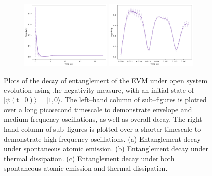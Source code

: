 \documentclass[11pt]{article}
\begin{document}
\begin{figure}[H]
    \vspace{0.8em}

    \begin{subfigure}{\textwidth}
        \centering
        \includegraphics[width=0.49\textwidth]{Research Project/Code/results/ExVib/Open/Negativity/Envelope/neg_both_e0.png}
        \hfill
        \includegraphics[width=0.49\textwidth]{Research Project/Code/results/ExVib/Open/Negativity/Fast/neg_both_e0.png}
        \caption{}
        \label{fig:EVM_OQS_Neg_both_e0}
    \end{subfigure}
    \caption{Plots of the decay of entanglement of the EVM under open system evolution using the negativity measure, with an initial state of $|\psi (\text{t=0})\rangle = |1, 0\rangle$. The left--hand column of sub--figures is plotted over a long picosecond timescale to demonstrate envelope and medium frequency oscillations, as well as overall decay. The right--hand column of sub--figures is plotted over a shorter timescale to demonstrate high frequency oscillations. (a) Entanglement decay under spontaneous atomic emission. (b) Entanglement decay under thermal dissipation. (c) Entanglement decay under both spontaneous atomic emission and thermal dissipation.}
    \label{fig:EVM_OQS_Neg_e0}
\end{figure}
\end{document}
